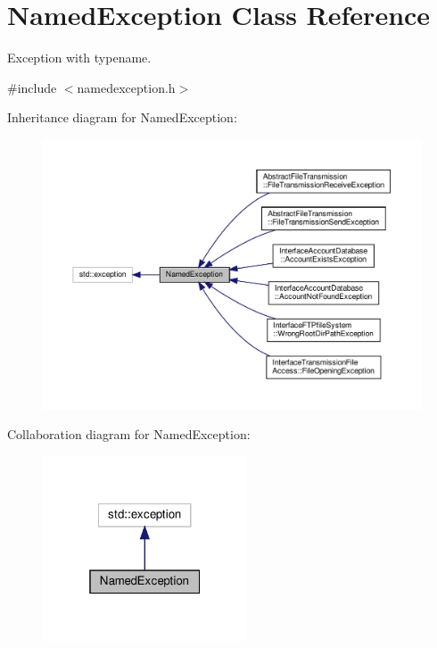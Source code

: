 \hypertarget{classNamedException}{}\section{Named\+Exception Class Reference}
\label{classNamedException}


Exception with typename.  




{\ttfamily \#include $<$namedexception.\+h$>$}



Inheritance diagram for Named\+Exception\+:\nopagebreak
\begin{figure}[H]
\begin{center}
\leavevmode
\includegraphics[width=350pt]{d1/d07/classNamedException__inherit__graph}
\end{center}
\end{figure}


Collaboration diagram for Named\+Exception\+:\nopagebreak
\begin{figure}[H]
\begin{center}
\leavevmode
\includegraphics[width=172pt]{d0/d50/classNamedException__coll__graph}
\end{center}
\end{figure}
